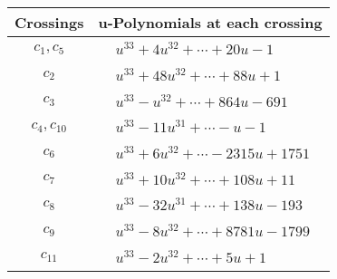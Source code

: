 \documentclass[1p]{elsarticle_modified}
\theoremstyle{definition}
\begin{document}
\begin{tabular}{m{50pt}|m{274pt}}
Crossings & \hspace{64pt}u-Polynomials at each crossing \\
\hline $$\begin{aligned}c_{1},c_{5}\end{aligned}$$&$\begin{aligned}
&u^{33}+4 u^{32}+\cdots+20 u-1
\end{aligned}$\\
\hline $$\begin{aligned}c_{2}\end{aligned}$$&$\begin{aligned}
&u^{33}+48 u^{32}+\cdots+88 u+1
\end{aligned}$\\
\hline $$\begin{aligned}c_{3}\end{aligned}$$&$\begin{aligned}
&u^{33}- u^{32}+\cdots+864 u-691
\end{aligned}$\\
\hline $$\begin{aligned}c_{4},c_{10}\end{aligned}$$&$\begin{aligned}
&u^{33}-11 u^{31}+\cdots- u-1
\end{aligned}$\\
\hline $$\begin{aligned}c_{6}\end{aligned}$$&$\begin{aligned}
&u^{33}+6 u^{32}+\cdots-2315 u+1751
\end{aligned}$\\
\hline $$\begin{aligned}c_{7}\end{aligned}$$&$\begin{aligned}
&u^{33}+10 u^{32}+\cdots+108 u+11
\end{aligned}$\\
\hline $$\begin{aligned}c_{8}\end{aligned}$$&$\begin{aligned}
&u^{33}-32 u^{31}+\cdots+138 u-193
\end{aligned}$\\
\hline $$\begin{aligned}c_{9}\end{aligned}$$&$\begin{aligned}
&u^{33}-8 u^{32}+\cdots+8781 u-1799
\end{aligned}$\\
\hline $$\begin{aligned}c_{11}\end{aligned}$$&$\begin{aligned}
&u^{33}-2 u^{32}+\cdots+5 u+1
\end{aligned}$\\
\hline
\end{tabular}\\~\\
\end{document}
